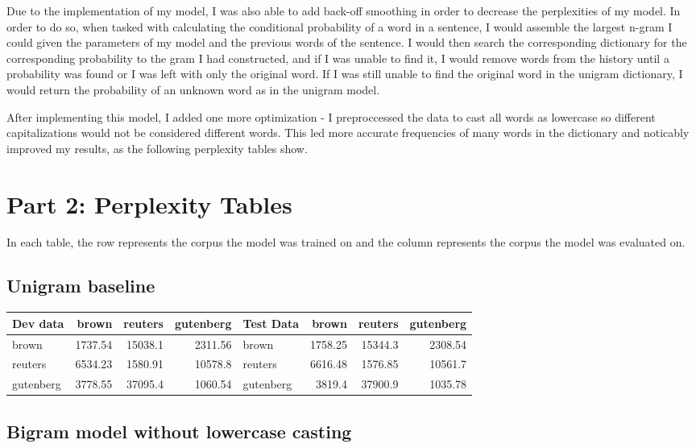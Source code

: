 \documentclass{article}
\begin{document}
\quad Due to the implementation of my model, I was also able to add back-off smoothing in order to decrease the perplexities of my model. In order to do so, when tasked with calculating the conditional probability of a word in a sentence, I would assemble the largest n-gram I could given the parameters of my model and the previous words of the sentence. I would then search the corresponding dictionary for the corresponding probability to the gram I had constructed, and if I was unable to find it, I would remove words from the history until a probability was found or I was left with only the original word. If I was still unable to find the original word in the unigram dictionary, I would return the probability of an unknown word as in the unigram model.

\quad After implementing this model, I added one more optimization - I preproccessed the data to cast all words as lowercase so different capitalizations would not be considered different words. This led more accurate frequencies of many words in the dictionary and noticably improved my results, as the following perplexity tables show.

\section{Part 2: Perplexity Tables}
In each table, the row represents the corpus the model was trained on and the column represents the corpus the model was evaluated on.

\subsection{Unigram baseline}

\begin{tabular}{lrrr|lrrr}
\hline
Dev data   &    brown &   reuters &   gutenberg & Test Data &     brown &   reuters &   gutenberg \\
\hline
 brown     & 1737.54 &  15038.1  &     2311.56 & brown     & 1758.25 &  15344.3  &     2308.54 \\
 reuters   & 6534.23 &   1580.91 &    10578.8  & reuters   & 6616.48 &   1576.85 &    10561.7  \\
 gutenberg & 3778.55 &  37095.4  &     1060.54 & gutenberg & 3819.4  &  37900.9  &     1035.78 \\
\hline
\end{tabular}

\subsection{Bigram model without lowercase casting}
\end{document}
